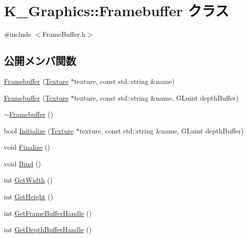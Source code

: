 \hypertarget{class_k___graphics_1_1_framebuffer}{}\section{K\+\_\+\+Graphics\+:\+:Framebuffer クラス}
\label{class_k___graphics_1_1_framebuffer}


{\ttfamily \#include $<$Frame\+Buffer.\+h$>$}

\subsection*{公開メンバ関数}
\begin{DoxyCompactItemize}
\item 
\mbox{\hyperlink{class_k___graphics_1_1_framebuffer_a3f5d49c84ad44a44ca9878620d8b646d}{Framebuffer}} (\mbox{\hyperlink{class_k___graphics_1_1_texture}{Texture}} $\ast$texture, const std\+::string \&name)
\item 
\mbox{\hyperlink{class_k___graphics_1_1_framebuffer_a7c8f64070ecd55069b6964f1a5b48427}{Framebuffer}} (\mbox{\hyperlink{class_k___graphics_1_1_texture}{Texture}} $\ast$texture, const std\+::string \&name, G\+Luint depth\+Buffer)
\item 
\mbox{\hyperlink{class_k___graphics_1_1_framebuffer_ad3a492836b1ced0414f6b3aa4718097f}{$\sim$\+Framebuffer}} ()
\item 
bool \mbox{\hyperlink{class_k___graphics_1_1_framebuffer_a109152dd1cce45054686bcb1f6576528}{Initialize}} (\mbox{\hyperlink{class_k___graphics_1_1_texture}{Texture}} $\ast$texture, const std\+::string \&name, G\+Luint depth\+Buffer)
\item 
void \mbox{\hyperlink{class_k___graphics_1_1_framebuffer_adfc67359931e99fed0f3c2205dad593b}{Finalize}} ()
\item 
void \mbox{\hyperlink{class_k___graphics_1_1_framebuffer_afdbf1b4cf70c68149cd6c146d6a32687}{Bind}} ()
\item 
int \mbox{\hyperlink{class_k___graphics_1_1_framebuffer_a14bef34a3d986bca79cb0af59415bb3c}{Get\+Width}} ()
\item 
int \mbox{\hyperlink{class_k___graphics_1_1_framebuffer_aade734f04f110482729a7031f8b6301b}{Get\+Height}} ()
\item 
int \mbox{\hyperlink{class_k___graphics_1_1_framebuffer_a1f12c09991f4bb042206cd846b99b2ac}{Get\+Frame\+Buffer\+Handle}} ()
\item 
int \mbox{\hyperlink{class_k___graphics_1_1_framebuffer_aac0fa7173df91438b489cab5870e07eb}{Get\+Depth\+Buffer\+Handle}} ()
\end{DoxyCompactItemize}


